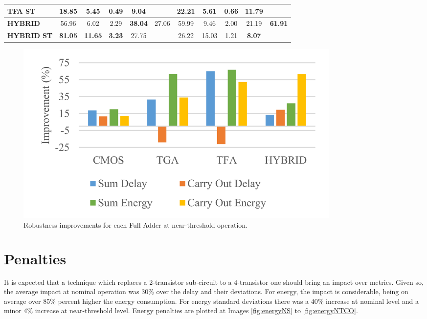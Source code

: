 \documentclass[ecp,tc, english]{iiufrgs}
\begin{document}
\begin{table}[!htbp]
{\begin{tabular}{lcccccccccc}
\textbf{TFA ST}                            & 18.85          & 5.45           & \textbf{0.49} & \textbf{9.04}  &                                 & \textbf{22.21} & 5.61           & 0.66          & 11.79          &                                 \\ \hline
\textbf{HYBRID}                            & 56.96          & 6.02           & 2.29          & \textbf{38.04} & \multirow{2}{*}{27.06}          & 59.99          & 9.46           & 2.00          & 21.19          & \multirow{2}{*}{\textbf{61.91}} \\ \cline{1-5} \cline{7-10}
\textbf{HYBRID ST}                         & \textbf{81.05} & \textbf{11.65} & \textbf{3.23} & 27.75          &                                 & 26.22          & 15.03          & 1.21          & \textbf{8.07}  &                                 \\ \hline
\end{tabular}%
}
\end{table}

\begin{figure}[!htb]
\centering
\includegraphics[width=0.8\textwidth]{NTimprov.png}
\caption{Robustness improvements for each Full Adder at near-threshold operation.}
\label{fig:NTimprov}
\end{figure}

\section{Penalties}

It is expected that a technique which replaces a 2-transistor sub-circuit to a 4-transistor one should bring an impact over metrics. Given so, the average impact at nominal operation was 30\% over the delay and their deviations. For energy, the impact is considerable, being on average over 85\% percent higher the energy consumption. For energy standard deviations there was a 40\% increase at nominal level and a minor 4\% increase at near-threshold level. Energy penalties are plotted at Images \ref{fig:energyNS} to \ref{fig:energyNTCO}.
\end{document}
